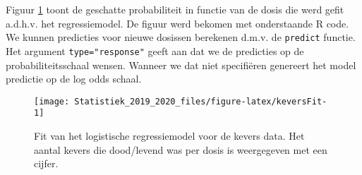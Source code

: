 \documentclass[12pt,dutch,coursenotes]{book}
\newenvironment{Shaded}{\begin{snugshade}}{\end{snugshade}}
\newcommand{\KeywordTok}[1]{\textcolor[rgb]{0.13,0.29,0.53}{\textbf{#1}}}
\newcommand{\DataTypeTok}[1]{\textcolor[rgb]{0.13,0.29,0.53}{#1}}
\newcommand{\DecValTok}[1]{\textcolor[rgb]{0.00,0.00,0.81}{#1}}
\newcommand{\FloatTok}[1]{\textcolor[rgb]{0.00,0.00,0.81}{#1}}
\newcommand{\StringTok}[1]{\textcolor[rgb]{0.31,0.60,0.02}{#1}}
\newcommand{\CommentTok}[1]{\textcolor[rgb]{0.56,0.35,0.01}{\textit{#1}}}
\newcommand{\OperatorTok}[1]{\textcolor[rgb]{0.81,0.36,0.00}{\textbf{#1}}}
\newcommand{\NormalTok}[1]{#1}
\theoremstyle{definition}
\theoremstyle{definition}
\theoremstyle{definition}
\theoremstyle{remark}
\begin{document}
Figuur \ref{fig:keversFit} toont de geschatte probabiliteit in functie
van de dosis die werd gefit a.d.h.v. het regressiemodel. De figuur werd
bekomen met onderstaande R code. We kunnen predicties voor nieuwe
dosissen berekenen d.m.v. de \texttt{predict} functie. Het argument
\texttt{type="response"} geeft aan dat we de predicties op de
probabiliteitsschaal wensen. Wanneer we dat niet specifiëren genereert
het model predictie op de log odds schaal.

\begin{Shaded}
\end{Shaded}

\begin{figure}

{\centering \texttt{[image: Statistiek\_2019\_2020\_files/figure-latex/keversFit-1]} 

}

\caption{Fit van het logistische regressiemodel voor de kevers data. Het aantal kevers die dood/levend was per dosis is weergegeven met een cijfer.}\label{fig:keversFit}
\end{figure}
\end{document}
